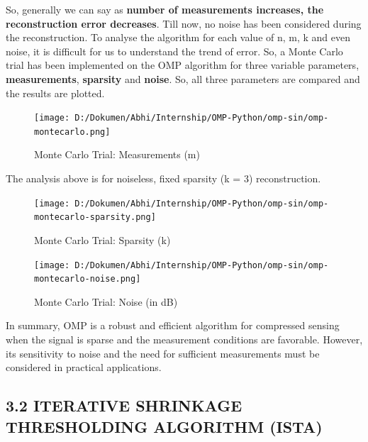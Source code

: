 \documentclass[
  letterpaper,
  DIV=11,
  numbers=noendperiod]{scrartcl}
\begin{document}
So, generally we can say as \textbf{number of measurements increases,
the reconstruction error decreases}. Till now, no noise has been
considered during the reconstruction. To analyse the algorithm for each
value of n, m, k and even noise, it is difficult for us to understand
the trend of error. So, a Monte Carlo trial has been implemented on the
OMP algorithm for three variable parameters, \textbf{measurements},
\textbf{sparsity} and \textbf{noise}. So, all three parameters are
compared and the results are plotted.

\begin{figure}[H]

{\centering \texttt{[image: D:/Dokumen/Abhi/Internship/OMP-Python/omp-sin/omp-montecarlo.png]}

}

\caption{Monte Carlo Trial: Measurements (m)}

\end{figure}%

The analysis above is for noiseless, fixed sparsity (k = 3)
reconstruction.

\begin{figure}[H]

{\centering \texttt{[image: D:/Dokumen/Abhi/Internship/OMP-Python/omp-sin/omp-montecarlo-sparsity.png]}

}

\caption{Monte Carlo Trial: Sparsity (k)}

\end{figure}%

\begin{figure}[H]

{\centering \texttt{[image: D:/Dokumen/Abhi/Internship/OMP-Python/omp-sin/omp-montecarlo-noise.png]}

}

\caption{Monte Carlo Trial: Noise (in dB)}

\end{figure}%

In summary, OMP is a robust and efficient algorithm for compressed
sensing when the signal is sparse and the measurement conditions are
favorable. However, its sensitivity to noise and the need for sufficient
measurements must be considered in practical applications.

\subsection{3.2 ITERATIVE SHRINKAGE THRESHOLDING ALGORITHM
(ISTA)}\label{iterative-shrinkage-thresholding-algorithm-ista}
\end{document}
